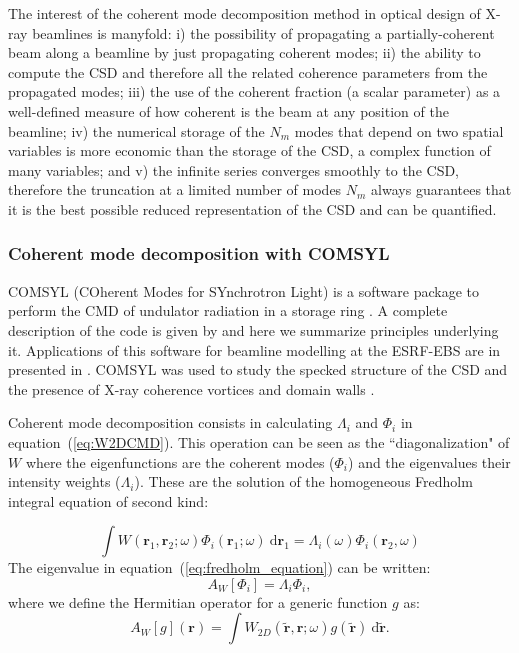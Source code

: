 \documentclass{iucr}              %
\begin{document}
The interest of the coherent mode decomposition method in optical design of X-ray beamlines is manyfold: 
i) the possibility of propagating a partially-coherent beam along a beamline by just propagating coherent modes; 
ii) the ability to compute the CSD and therefore all the related coherence parameters from the propagated modes;
iii) the use of the coherent fraction (a scalar parameter) as a well-defined measure of how coherent is the beam at any position of the beamline;
iv) the numerical storage of the $N_m$ modes that depend on two spatial variables is more economic than the storage of the CSD, a complex function of many variables;
and v) the infinite series converges smoothly to the CSD, therefore the truncation at a limited number of modes $N_m$ always guarantees that it is the best possible reduced representation of the CSD and can be quantified.


\subsubsection{Coherent mode decomposition with COMSYL\\}\label{sec:COMSYL} 
 COMSYL (COherent Modes for SYnchrotron Light) is a software package to perform the CMD of undulator radiation in a storage ring \cite{codeCOMSYL}. A complete description of the code is given by  and here we summarize principles underlying it. Applications of this software for beamline modelling at the ESRF-EBS are in presented in \cite{glass2017, hierarchical}. COMSYL was used to study the specked structure of the CSD and the presence of X-ray coherence vortices and domain walls \cite{PaganinSanchezDelRio2019}.

Coherent mode decomposition consists in calculating $\Lambda_i$ and $\Phi_i$ in equation~(\ref{eq:W2DCMD}). This operation can be seen as the ``diagonalization" of $W$ where the eigenfunctions are the coherent modes ($\Phi_i$) and the eigenvalues their intensity weights ($\Lambda_i$). These are the solution of the homogeneous Fredholm integral equation of second kind:

\begin{equation}\label{eq:fredholm_equation}
\int W(\textbf{r}_1,\textbf{r}_2;\omega)
\Phi_i(\textbf{r}_1;\omega)~\text{d}\textbf{r}_1  = \Lambda_i(\omega) \Phi_i(\textbf{r}_2,\omega)
\end{equation}
The eigenvalue in equation~(\ref{eq:fredholm_equation}) can be written: 
\begin{equation}
A_{W}[\Phi_i] = \Lambda_i \Phi_i,
\end{equation}
where we define the Hermitian operator for a generic function $g$ as:
\begin{equation}\label{eq:Hermitian}
A_{W}[g](\textbf{r})  = \int W_{2D}(\tilde{\textbf{r}},\textbf{r};\omega) g(\tilde{\textbf{r}})~ \text{d}\tilde{\textbf{r}}.
\end{equation}
\end{document}
